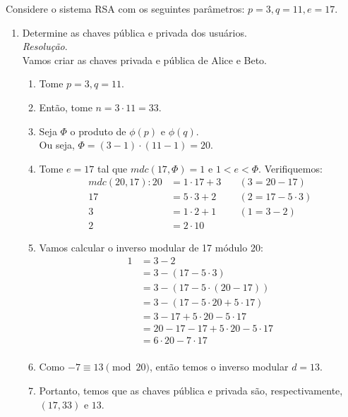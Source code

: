 Considere o sistema RSA com os seguintes parâmetros: 
$p = 3, q = 11, e = 17$. \\
\begin{enumerate}
	\item Determine as chaves pública e privada dos usuários. \\ 
	\emph{Resolução}. \\
	Vamos criar as chaves privada e pública de Alice e Beto. \\
	\begin{enumerate}
		\item Tome $p = 3, q = 11$. 
		\item Então, tome $n = 3 \cdot 11 = 33$. 
		\item Seja $\Phi$ o produto de $\phi(p)$ e $\phi(q)$. \\ 
			Ou seja, $\Phi = (3 - 1) \cdot (11 - 1) = 20$.
		\item Tome $e = 17$ tal que $mdc(17, \Phi) = 1$ e $1 < e < \Phi$. Verifiquemos:
			\begin{align*}
				mdc(20, 17): 20 &= 1 \cdot 17 + 3 &\quad (3 = 20 - 17) \\
						17 &= 5 \cdot 3 + 2 &\quad (2 = 17 - 5 \cdot 3) \\ 
						3 &= 1 \cdot 2 + 1 &\quad (1 = 3 - 2) \\ 
						2 &= 2 \cdot 1 0
			\end{align*}
		\item Vamos calcular o inverso modular de 17 módulo 20:
			\begin{align*}
				1 &= 3 - 2 \\ 
				&= 3 - (17 - 5 \cdot 3) \\
				&= 3 - (17 - 5 \cdot (20 - 17)) \\
				&= 3 - (17 - 5 \cdot 20 + 5 \cdot 17) \\
				&= 3 - 17 + 5 \cdot 20 - 5 \cdot 17 \\
				&= 20 - 17 - 17 + 5 \cdot 20 - 5 \cdot 17 \\
				&= 6 \cdot 20 - 7 \cdot 17 \\
			\end{align*}
		\item Como $-7 \equiv 13 \pmod{20}$, então temos o inverso modular $d = 13$. 
		\item Portanto, temos que as chaves pública e privada são, respectivamente, $(17, 33)$ e $13$.
	\end{enumerate}


\end{enumerate}
